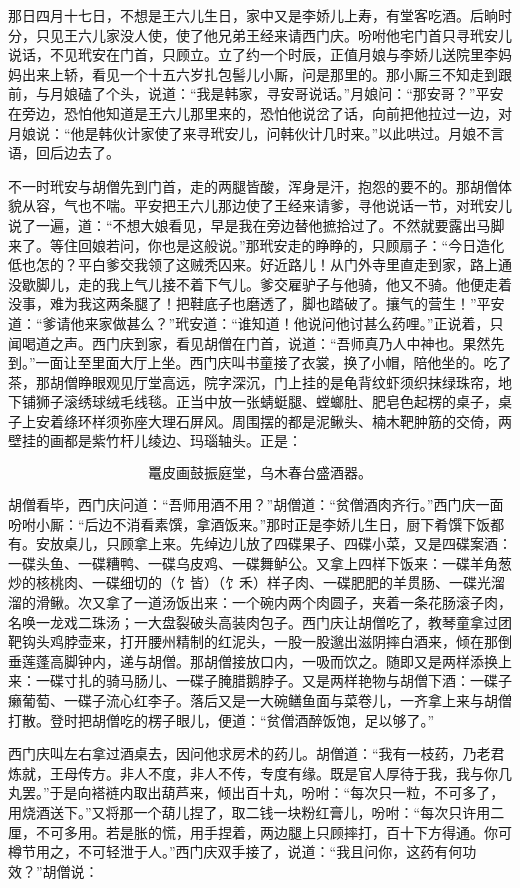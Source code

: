 那日四月十七日，不想是王六儿生日，家中又是李娇儿上寿，有堂客吃酒。后晌时分，只见王六儿家没人使，使了他兄弟王经来请西门庆。吩咐他宅门首只寻玳安儿说话，不见玳安在门首，只顾立。立了约一个时辰，正值月娘与李娇儿送院里李妈妈出来上轿，看见一个十五六岁扎包髻儿小厮，问是那里的。那小厮三不知走到跟前，与月娘磕了个头，说道：“我是韩家，寻安哥说话。”月娘问：“那安哥？”平安在旁边，恐怕他知道是王六儿那里来的，恐怕他说岔了话，向前把他拉过一边，对月娘说：“他是韩伙计家使了来寻玳安儿，问韩伙计几时来。”以此哄过。月娘不言语，回后边去了。

不一时玳安与胡僧先到门首，走的两腿皆酸，浑身是汗，抱怨的要不的。那胡僧体貌从容，气也不喘。平安把王六儿那边使了王经来请爹，寻他说话一节，对玳安儿说了一遍，道：“不想大娘看见，早是我在旁边替他摭拾过了。不然就要露出马脚来了。等住回娘若问，你也是这般说。”那玳安走的睁睁的，只顾扇子：“今日造化低也怎的？平白爹交我领了这贼秃囚来。好近路儿！从门外寺里直走到家，路上通没歇脚儿，走的我上气儿接不着下气儿。爹交雇驴子与他骑，他又不骑。他便走着没事，难为我这两条腿了！把鞋底子也磨透了，脚也踏破了。攘气的营生！”平安道：“爹请他来家做甚么？”玳安道：“谁知道！他说问他讨甚么药哩。”正说着，只闻喝道之声。西门庆到家，看见胡僧在门首，说道：“吾师真乃人中神也。果然先到。”一面让至里面大厅上坐。西门庆叫书童接了衣裳，换了小帽，陪他坐的。吃了茶，那胡僧睁眼观见厅堂高远，院字深沉，门上挂的是龟背纹虾须织抹绿珠帘，地下铺狮子滚绣球绒毛线毯。正当中放一张蜻蜓腿、螳螂肚、肥皂色起楞的桌子，桌子上安着绦环样须弥座大理石屏风。周围摆的都是泥鳅头、楠木靶肿筋的交倚，两壁挂的画都是紫竹杆儿绫边、玛瑙轴头。正是：

\[
鼍皮画鼓振庭堂，乌木春台盛酒器。
\]

胡僧看毕，西门庆问道：“吾师用酒不用？”胡僧道：“贫僧酒肉齐行。”西门庆一面吩咐小厮：“后边不消看素馔，拿酒饭来。”那时正是李娇儿生日，厨下肴馔下饭都有。安放桌儿，只顾拿上来。先绰边儿放了四碟果子、四碟小菜，又是四碟案酒：一碟头鱼、一碟糟鸭、一碟乌皮鸡、一碟舞鲈公。又拿上四样下饭来：一碟羊角葱炒的核桃肉、一碟细切的（饣皆）（饣禾）样子肉、一碟肥肥的羊贯肠、一碟光溜溜的滑鳅。次又拿了一道汤饭出来：一个碗内两个肉圆子，夹着一条花肠滚子肉，名唤一龙戏二珠汤；一大盘裂破头高装肉包子。西门庆让胡僧吃了，教琴童拿过团靶钩头鸡脖壶来，打开腰州精制的红泥头，一股一股邈出滋阴摔白酒来，倾在那倒垂莲蓬高脚钟内，递与胡僧。那胡僧接放口内，一吸而饮之。随即又是两样添换上来：一碟寸扎的骑马肠儿、一碟子腌腊鹅脖子。又是两样艳物与胡僧下酒：一碟子癞葡萄、一碟子流心红李子。落后又是一大碗鳝鱼面与菜卷儿，一齐拿上来与胡僧打散。登时把胡僧吃的楞子眼儿，便道：“贫僧酒醉饭饱，足以够了。”

西门庆叫左右拿过酒桌去，因问他求房术的药儿。胡僧道：“我有一枝药，乃老君炼就，王母传方。非人不度，非人不传，专度有缘。既是官人厚待于我，我与你几丸罢。”于是向褡裢内取出葫芦来，倾出百十丸，吩咐：“每次只一粒，不可多了，用烧酒送下。”又将那一个葫儿捏了，取二钱一块粉红膏儿，吩咐：“每次只许用二厘，不可多用。若是胀的慌，用手捏着，两边腿上只顾摔打，百十下方得通。你可樽节用之，不可轻泄于人。”西门庆双手接了，说道：“我且问你，这药有何功效？”胡僧说：

